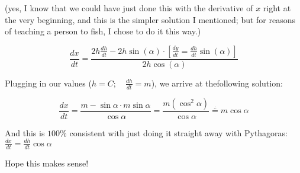 \documentclass{article}
\begin{document}
(yes, I know that we could have just done this with the derivative of $x$ right at the very beginning, and this is the simpler solution I mentioned; but for reasons of teaching a person to fish, I chose to do it this way.)

\[\frac{dx}{dt}=\frac{2h\frac{dh}{dt}-2h\sin(\alpha)\cdot\left[\frac{dy}{dt}=\frac{dh}{dt}\sin(\alpha)\right]}{2h\cos(\alpha)}\]

\vspace{10pt}

Plugging in our values ($h=C;\quad\frac{dh}{dt}=m$), we arrive at thefollowing solution:

\[\frac{dx}{dt}=\frac{m-\sin\alpha\cdot m\sin\alpha}{\cos\alpha}=\frac{m(\cos^2\alpha)}{\cos\alpha}\overset{\therefore}{=}m\cos\alpha\]

\vspace{10pt}

And this is $100\%$ consistent with just doing it straight away with Pythagoras: $\frac{dx}{dt}=\frac{dh}{dt}\cos\alpha$

\vspace{10pt}

Hope this makes sense!
\end{document}
